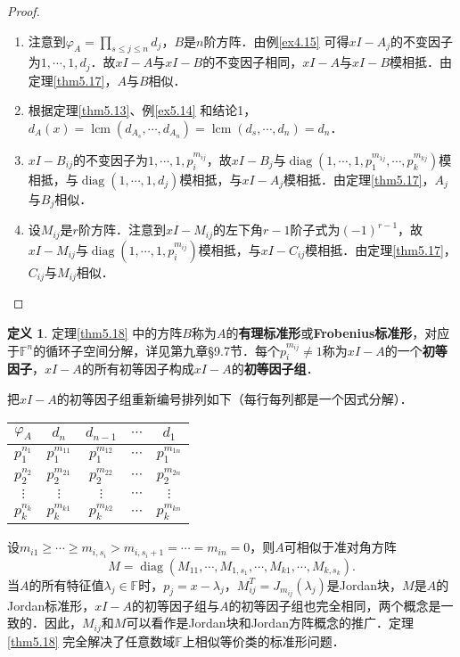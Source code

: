 \documentclass[a4paper,fontset=windows]{ctexbook}
\theoremstyle{definition}
\newtheorem{definition}{定义}[chapter]
\DeclareMathOperator{\diag}{diag}
\DeclareMathOperator{\lcm}{lcm}
\renewcommand{\le}{\leqslant}
\renewcommand{\ge}{\geqslant}
\begin{document}
\begin{proof}~
\begin{enumerate}
\item 注意到$\varphi_A=\prod\limits_{s\le j\le n}d_j$，$B$是$n$阶方阵．由例\ref{ex4.15} 可得$xI-A_j$的不变因子为$1,\cdots,1,d_j$．故$xI-A$与$xI-B$的不变因子相同，$xI-A$与$xI-B$模相抵．由定理\ref{thm5.17}，$A$与$B$相似．

\item 根据定理\ref{thm5.13}、例\ref{ex5.14} 和结论1，$d_A(x)=\lcm(d_{A_s},\cdots,d_{A_n})=\lcm(d_s,\cdots,d_n)=d_n$．

\item $xI-B_{ij}$的不变因子为$1,\cdots,1,p_i^{m_{ij}}$，故$xI-B_j$与$\diag(1,\cdots,1,p_1^{m_{1j}},\cdots,p_k^{m_{kj}})$模相抵，与$\diag(1,\cdots,1,d_j)$模相抵，与$xI-A_j$模相抵．由定理\ref{thm5.17}，$A_j$与$B_j$相似．

\item 设$M_{ij}$是$r$阶方阵．注意到$xI-M_{ij}$的左下角$r-1$阶子式为$(-1)^{r-1}$，故$xI-M_{ij}$与$\diag(1,\cdots,1,p_i^{m_{ij}})$模相抵，与$xI-C_{ij}$模相抵．由定理\ref{thm5.17}，$C_{ij}$与$M_{ij}$相似．\qedhere
\end{enumerate}
\end{proof}

\begin{definition}\label{def5.8}
定理\ref{thm5.18} 中的方阵$B$称为$A$的{\bf 有理标准形}或{\bf Frobenius标准形}，对应于$\mathbb{F}^n$的循环子空间分解，详见第九章\S 9.7节．每个$p_i^{m_{ij}}\ne 1$称为$xI-A$的一个{\bf 初等因子}，$xI-A$的所有初等因子构成$xI-A$的{\bf 初等因子组}．
\end{definition}

把$xI-A$的初等因子组重新编号排列如下（每行每列都是一个因式分解）．
\begin{center}\begin{tabular}{c|cccc}
$\varphi_A$&$d_n$&$d_{n-1}$&$\cdots$&$d_1$ \\
\hline $p_1^{n_1}$&$p_1^{m_{11}}$&$p_1^{m_{12}}$&$\cdots$&$p_1^{m_{1n}}$ \\
$p_2^{n_2}$&$p_2^{m_{21}}$&$p_2^{m_{22}}$&$\cdots$&$p_2^{m_{2n}}$ \\
$\vdots$&$\vdots$&$\vdots$&$\cdots$&$\vdots$ \\
$p_k^{n_k}$&$p_k^{m_{k1}}$&$p_k^{m_{k2}}$&$\cdots$&$p_k^{m_{kn}}$
\end{tabular}\end{center}
设$m_{i1}\ge\cdots\ge m_{i,s_i}>m_{i,s_i+1}=\cdots=m_{in}=0$，则$A$可相似于准对角方阵
$$M=\diag(M_{11},\cdots,M_{1,s_1},\cdots,M_{k1},\cdots,M_{k,s_k}).$$
当$A$的所有特征值$\lambda_j\in\mathbb{F}$时，$p_j=x-\lambda_j$，$M_{ij}^T=J_{m_{ij}}(\lambda_j)$是Jordan块，$M$是$A$的Jordan标准形，$xI-A$的初等因子组与$A$的初等因子组也完全相同，两个概念是一致的．因此，$M_{ij}$和$M$可以看作是Jordan块和Jordan方阵概念的推广．定理\ref{thm5.18} 完全解决了任意数域$\mathbb{F}$上相似等价类的标准形问题．
\end{document}
